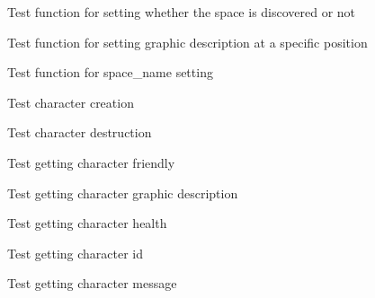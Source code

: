 \begin{DoxyRefList}
%
Test function for setting whether the space is discovered or not  
\item[Global \doxylink{space__test_8c_a161cb78344a0bbd4331f4c4753c7a92f}{test1\+\_\+space\+\_\+set\+\_\+gdesc\+\_\+at} ()]\label{test__test000197}%
%
Test function for setting graphic description at a specific position  
\item[Global \doxylink{space__test_8c_a2569bab6cfeec15f722d232bb8c78c9e}{test1\+\_\+space\+\_\+set\+\_\+name} ()]\label{test__test000186}%
%
Test function for space\+\_\+name setting  
\item[Global \doxylink{character__test_8c_af34c287530289519f39a8c676ab1f296}{test2\+\_\+character\+\_\+create} ()]\label{test__test000002}%
%
Test character creation  
\item[Global \doxylink{character__test_8c_aa5f08ffbb6afcf44a3640002431b4611}{test2\+\_\+character\+\_\+destroy} ()]\label{test__test000005}%
%
Test character destruction  
\item[Global \doxylink{character__test_8c_a86a876aee28d07e4f303bc58c5a64f51}{test2\+\_\+character\+\_\+get\+\_\+friendly} ()]\label{test__test000022}%
%
Test getting character friendly  
\item[Global \doxylink{character__test_8c_a0a36400b7491ab6e9326ce661e61c611}{test2\+\_\+character\+\_\+get\+\_\+gdesc} ()]\label{test__test000013}%
%
Test getting character graphic description  
\item[Global \doxylink{character__test_8c_a73548b592b58d36e2c9579512396444c}{test2\+\_\+character\+\_\+get\+\_\+health} ()]\label{test__test000019}%
%
Test getting character health  
\item[Global \doxylink{character__test_8c_acc183175913712e7f2b0e98a9b55bc2b}{test2\+\_\+character\+\_\+get\+\_\+id} ()]\label{test__test000007}%
%
Test getting character id  
\item[Global \doxylink{character__test_8c_a085a8c64daee7cb3a5bc38a9017717ba}{test2\+\_\+character\+\_\+get\+\_\+message} ()]\label{test__test000016}%
%
Test getting character message  
\item[Global \doxylink{character__test_8c_a01ef678eee58465bbdc52094838a65f7}{test2\+\_\+character\+\_\+get\+\_\+name} ()]\label{test__test000010}%
%

\end{DoxyRefList}
